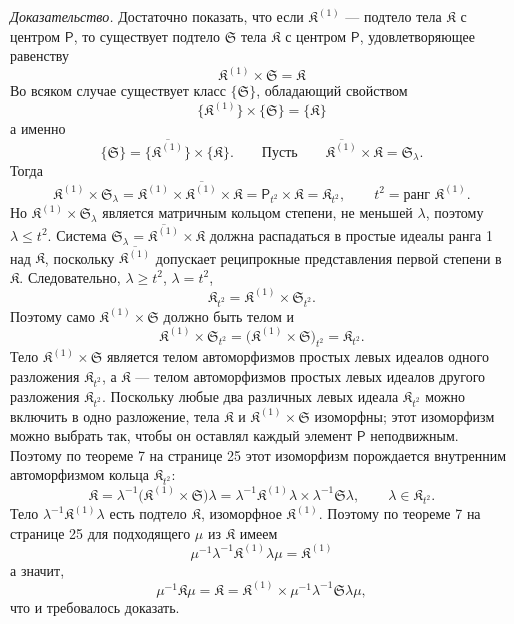 \documentclass[11pt]{article}
\begin{document}
\emph{Доказательство.} Достаточно показать, что если \(\mathfrak K^{(1)}\) --- подтело тела \(\mathfrak K\) с центром \(\mathsf P\), то существует подтело \(\mathfrak S\) тела \(\mathfrak K\) с центром \(\mathsf P\), удовлетворяющее равенству
\[
\mathfrak K^{(1)}\times\mathfrak S=\mathfrak K
\]
Во всяком случае существует класс \(\{\mathfrak S\}\), обладающий свойством
\[
\{\mathfrak K^{(1)}\}\times\{\mathfrak S\}=\{\mathfrak K\}
\]
а именно
\[
\{\mathfrak S\}=\{\overline{\mathfrak K^{(1)}}\}\times\{\mathfrak K\}.
\qquad
\text{Пусть}\qquad
\overline{\mathfrak K^{(1)}}\times\mathfrak K=\mathfrak S_\lambda.
\]
Тогда
\[
\mathfrak K^{(1)}\times\mathfrak S_\lambda
=\mathfrak K^{(1)}\times\overline{\mathfrak K^{(1)}}\times\mathfrak K
=\mathsf P_{t^2}\times\mathfrak K
=\mathfrak K_{t^2},
\qquad
t^2=\text{ранг }\mathfrak K^{(1)}.
\]
Но \(\mathfrak K^{(1)}\times\mathfrak S_\lambda\) является матричным кольцом степени, не меньшей \(\lambda\), поэтому \(\lambda\leq t^2\). Система \(\mathfrak S_\lambda=\overline{\mathfrak K^{(1)}}\times\mathfrak K\) должна распадаться в простые идеалы ранга 1 над \(\mathfrak K\), поскольку \(\overline{\mathfrak K^{(1)}}\) допускает реципрокные представления первой степени в \(\mathfrak K\). Следовательно, \(\lambda\geq t^2\), \(\lambda=t^2\),
\[
\mathfrak K_{t^2}=\mathfrak K^{(1)}\times\mathfrak S_{t^2}.
\]
Поэтому само \(\mathfrak K^{(1)}\times\mathfrak S\) должно быть телом и
\[
\mathfrak K^{(1)}\times\mathfrak S_{t^2}
=\bigl(\mathfrak K^{(1)}\times\mathfrak S\bigr)_{t^2}
=\mathfrak K_{t^2}.
\]
Тело \(\mathfrak K^{(1)}\times\mathfrak S\) является телом автоморфизмов простых левых идеалов одного разложения \(\mathfrak K_{t^2}\), а \(\mathfrak K\) --- телом автоморфизмов простых левых идеалов другого разложения \(\mathfrak K_{t^2}\). Поскольку любые два различных левых идеала \(\mathfrak K_{t^2}\) можно включить в одно разложение, тела \(\mathfrak K\) и \(\mathfrak K^{(1)}\times\mathfrak S\) изоморфны; этот изоморфизм можно выбрать так, чтобы он оставлял каждый элемент \(\mathsf P\) неподвижным. Поэтому по теореме 7 на странице 25 этот изоморфизм порождается внутренним автоморфизмом кольца \(\mathfrak K_{t^2}\):
\[
\mathfrak K
=\lambda^{-1}\bigl(\mathfrak K^{(1)}\times\mathfrak S\bigr)\lambda
=\lambda^{-1}\mathfrak K^{(1)}\lambda\times\lambda^{-1}\mathfrak S\lambda,
\qquad
\lambda\in\mathfrak K_{t^2}.
\]
Тело \(\lambda^{-1}\mathfrak K^{(1)}\lambda\) есть подтело \(\mathfrak K\), изоморфное \(\mathfrak K^{(1)}\). Поэтому по теореме 7 на странице 25 для подходящего \(\mu\) из \(\mathfrak K\) имеем
\[
\mu^{-1}\lambda^{-1}\mathfrak K^{(1)}\lambda\mu=\mathfrak K^{(1)}
\]
а значит,
\[
\mu^{-1}\mathfrak K\mu
=\mathfrak K
=\mathfrak K^{(1)}\times\mu^{-1}\lambda^{-1}\mathfrak S\lambda\mu,
\]
что и требовалось доказать.
\end{document}
